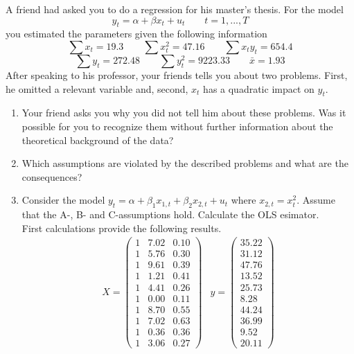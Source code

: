 \documentclass[captions=tableheading, 12pt, headings=small, parskip=half]{scrartcl}
\begin{document}
A friend had asked you to do a regression for his master's thesis. For the model
\[
y_t = \alpha + \beta x_t + u_t\qquad t = 1,...,T
\]you estimated the parameters given the following information
\[
	\sum x_t = 19.3 \qquad \sum x_t^2 = 47.16  \qquad \sum x_ty_t = 654.4 \]\[\sum y_t =272.48  \qquad \sum y_t^2 = 9223.33  \qquad \bar{x} = 1.93 \]
After speaking to his professor, your friends tells you about two problems. First, he omitted a relevant variable and, second, $x_t$ has a quadratic impact on $y_t$.
\begin{enumerate}[label = \alph*)]
	\item Your friend asks you why you did not tell him about these problems. Was it possible for you to recognize them without further information about the theoretical background of the data?
	\item Which assumptions are violated by the described problems and what are the consequences?
	\item Consider the model $y_t = \alpha + \beta_1 x_{1,t} + \beta_2 x_{2,t} + u_t$ where $x_{2,t} = x_t^2$. Assume that the A-, B- and C-assumptions hold. Calculate the OLS esimator.\\
	First calculations provide the following results. 
	\begin{equation*}
	\begin{array}{cc}
	X=%
	\begin{pmatrix}
	1 & 7.02 & 0.10 \\ 
	1 & 5.76 & 0.30 \\ 
	1 & 9.61 & 0.39 \\ 
	1 & 1.21 & 0.41 \\ 
	1 & 4.41 & 0.26 \\ 
	1 & 0.00 & 0.11 \\ 
	1 & 8.70 & 0.55 \\ 
	1 & 7.02 & 0.63 \\ 
	1 & 0.36 & 0.36 \\ 
	1 & 3.06 & 0.27%
	\end{pmatrix}
	& y=%
	\begin{pmatrix}
	35.22 \\ 
	31.12 \\ 
	47.76 \\ 
	13.52 \\ 
	25.73 \\ 
	8.28 \\ 
	44.24 \\ 
	36.99 \\ 
	9.52 \\ 
	20.11%

\end{pmatrix}
\end{array}
\end{equation*}
\end{enumerate}
\end{document}

